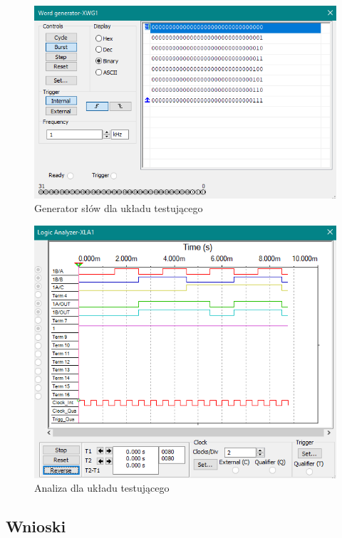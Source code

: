 \documentclass{article}
\begin{document}
\begin{figure}[H]
    \centering
    \includegraphics[width=\textwidth]{generator_test_1.png}
    \caption{Generator słów dla układu testującego}
\end{figure}

\begin{figure}[H]
    \centering
    \includegraphics[width=\textwidth]{analiza_test_1.png}
    \caption{Analiza dla układu testującego}
\end{figure}

\subsection{Wnioski}
\end{document}
